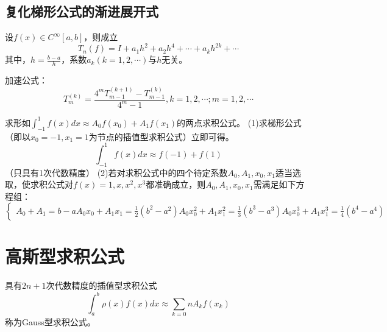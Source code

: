 \subsection{复化梯形公式的渐进展开式}
\begin{theorem}
    设$f(x)\in C^{\infty}[a,b]$，则成立
    \begin{equation*}
        T_n(f) = I+a_1h^2+a_2h^4+\cdots +a_kh^{2k}+\cdots 
    \end{equation*}
    其中，$h=\frac{b-a}{h}$，系数$a_k(k=1,2,\cdots)$与$h$无关。
\end{theorem}


加速公式：
\begin{equation*}
    T_m^{(k)} = \frac{4^mT_{m-1}^{(k+1)}-T_{m-1}^{(k)}}{4^m-1},k = 1,2,\cdots; m = 1,2,\cdots
\end{equation*}

\begin{example}
    求形如$\int_{-1}^{1}f(x)dx \approx A_0f(x_0)+A_1f(x_1)$的两点求积公式。
    (1)求梯形公式（即以$x_0 = -1,x_1 = 1$为节点的插值型求积公式）立即可得。
    \begin{equation*}
        \int_{-1}^{1}f(x)dx \approx f(-1)+f(1)
    \end{equation*}
    （只具有1次代数精度）
    (2)若对求积公式中的四个待定系数$A_0,A_1,x_0,x_1$适当选取，使求积公式对$f(x) = 1,x,x^2,x^3$都准确成立，则$A_0,A_1,x_0,x_1$需满足如下方程组：
    \begin{equation*}
        \begin{cases}
            A_0 + A_1 = b-a
            A_0x_0 + A_1x_1 = \frac{1}{2}(b^2-a^2)
            A_0x_0^2 + A_1x_1^2 = \frac{1}{3}(b^3-a^3)
            A_0x_0^3 + A_1x_1^3 = \frac{1}{4}(b^4-a^4)
        \end{cases}
    \end{equation*}
\end{example}


\section{高斯型求积公式}

\begin{definition}[Gauss型求积公式]
    具有$2n+1$次代数精度的插值型求积公式
    \begin{equation*}
        \int_{a}^{b}\rho(x)f(x)dx\approx \sum_{k=0}{n}A_kf(x_k)
    \end{equation*}
    称为Gauss型求积公式。
\end{definition}

